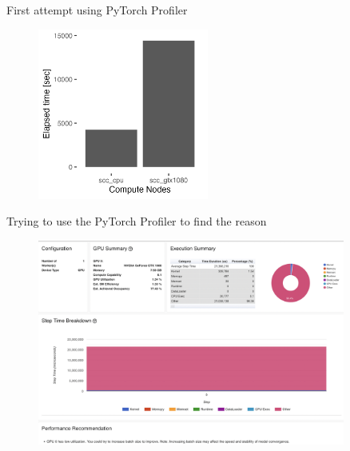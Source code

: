 \documentclass[compress,aspectratio=169]{beamer}
\begin{document}
\begin{frame}{First attempt using PyTorch Profiler}
    \begin{center}
    \begin{figure}
        \includegraphics[width=0.5\textwidth]{../../data/sacct_barplot_by_nodes_profiler-torch_sample-points}
    \end{figure}
    \end{center}
\end{frame}

\begin{frame}{Trying to use the PyTorch Profiler to find the reason}
	\vspace{-1em}
    \begin{center}
    \begin{figure}
        \includegraphics[width=0.9\textwidth]{../../data/scap_gtx1080_profiler-torch_sample-points_14650750}
    \end{figure}
    \end{center}
\end{frame}
\end{document}
